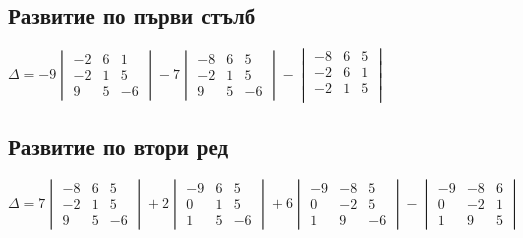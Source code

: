 \documentclass{article}
\begin{document}
    \subsection{Развитие по първи стълб}
    \(\Delta = -9 \begin{vmatrix}
        -2 & 6 & 1\\
        -2 & 1 & 5\\
        9 & 5 & -6
    \end{vmatrix} -7 \begin{vmatrix}
        -8 & 6 & 5\\
        -2 & 1 & 5\\
        9 & 5 & -6
    \end{vmatrix} - \begin{vmatrix}
        -8 & 6 & 5\\
        -2 & 6 & 1\\
        -2 & 1 & 5\\
    \end{vmatrix}\)
    \subsection{Развитие по втори ред}
    \(\Delta = 7 \begin{vmatrix}
        -8 & 6 & 5\\
        -2 & 1 & 5\\
        9 & 5 & -6
    \end{vmatrix} + 2 \begin{vmatrix}
        -9 & 6 & 5\\
        0 & 1 & 5\\
        1 & 5 & -6
    \end{vmatrix} + 6 \begin{vmatrix}
        -9 & -8 & 5\\
        0 & -2 & 5\\
        1 & 9 & -6
    \end{vmatrix} - \begin{vmatrix}
        -9 & -8 & 6\\
        0 & -2 & 1\\
        1 & 9 & 5
    \end{vmatrix}\)
\end{document}
